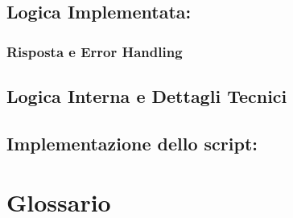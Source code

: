 \documentclass[a4paper,12pt]{article}
\begin{document}
\subsection{Logica Implementata: }
\subsubsection{Risposta e Error Handling}
\subsection{Logica Interna e Dettagli Tecnici}
\subsection{Implementazione dello script: }
\section{Glossario}
\end{document}
